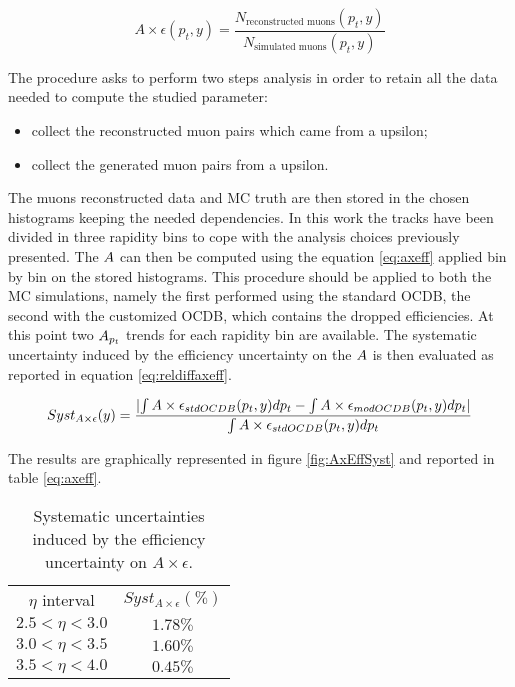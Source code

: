 \begin{equation}\label{eq:axeff}
	A\times\epsilon(p_t,y)=\frac{N_{\text{reconstructed muons}}(p_t,y)}{N_{\text{simulated muons}}(p_t,y)}
\end{equation}

The procedure asks to perform two steps analysis in order to retain all the data needed to compute the studied parameter:
\begin{itemize}
	\item collect the reconstructed muon pairs which came from a upsilon;
	\item collect the generated muon pairs from a upsilon.
\end{itemize}

The muons reconstructed data and MC truth are then stored in the chosen histograms keeping the needed dependencies. In this work the tracks have been divided in three rapidity bins to cope with the analysis choices previously presented. The $A\time\epsilon$ can then be computed using the equation \ref{eq:axeff} applied bin by bin on the stored histograms.
This procedure should be applied to both the MC simulations, namely the first performed using the standard OCDB, the second with the customized OCDB, which contains the dropped efficiencies.
At this point two $A\time\epsilon_{p_t}$ trends for each rapidity bin are available. The systematic uncertainty induced by the efficiency uncertainty on the $A\time\epsilon$ is then evaluated as reported in equation \ref{eq:reldiffaxeff}.

\begin{equation}\label{eq:reldiffaxeff}
	Syst_{A\times\epsilon}(y)=\frac{\lvert\int{A\times\epsilon_{std OCDB}(p_t,y)dp_t}-\int{A\times\epsilon_{mod OCDB}(p_t,y)dp_t}\rvert}{\int{A\times\epsilon_{std OCDB}(p_t,y)dp_t}}
\end{equation}

The results are graphically represented in figure \ref{fig:AxEffSyst} and reported in table \ref{eq:axeff}.

\begin{table}[!htb]
\centering
\begin{tabular}{ |c|c| }
 \hline
 $\eta$ interval&  $Syst_{A\times\epsilon} (\%)$  \\
 \hhline{|=|=|}
 $2.5<\eta<3.0$&  $1.78\%$  \\
 \hline
 $3.0<\eta<3.5$&  $1.60\%$  \\
 \hline
 $3.5<\eta<4.0$&  $0.45\%$  \\
 \hline
\end{tabular}
\caption{Systematic uncertainties induced by the efficiency uncertainty on $A\times\epsilon$.}
\label{tab:systAxEff}
\end{table}

